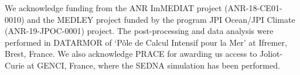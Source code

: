 \documentclass[draft]{agujournal2019}
\begin{document}
\acknowledgments
We acknowledge funding from the ANR ImMEDIAT project (ANR-18-CE01-0010) and the MEDLEY project funded by the program JPI Ocean/JPI Climate (ANR-19-JPOC-0001) project. 
The post-processing and data analysis were performed in DATARMOR of `Pôle de Calcul Intensif pour la Mer' at Ifremer, Brest, France. We also acknowledge PRACE for awarding us access to Joliot-Curie at GENCI\makeatletter@CEA, France, where the SEDNA simulation has been performed.


%
%



%
%
%
%
%




\end{document}
